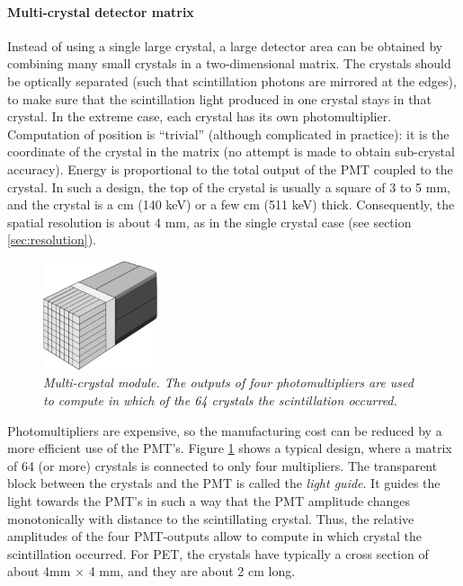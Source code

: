 \documentclass[11pt,oneside]{article}
\begin{document}
\paragraph{Multi-crystal detector matrix}
Instead of using a single large crystal, a large detector area can be
obtained by combining many small crystals in a two-dimensional
matrix. The crystals should be optically separated (such that
scintillation photons are mirrored at the edges), to make sure that
the scintillation light produced in one crystal stays in that
crystal. In the extreme case, each crystal has its own
photomultiplier. Computation of position is ``trivial'' (although
complicated in practice): it is the coordinate of the crystal in the
matrix (no attempt is made to obtain sub-crystal accuracy). Energy is
proportional to the total output of the PMT coupled to the crystal. In
such a design, the top of the crystal is usually a square of 3 to 5
mm, and the crystal is a cm (140 keV) or a few cm (511 keV) thick.
Consequently, the spatial resolution is about 4 mm, as in the single
crystal case (see section \ref{sec:resolution}).

\begin{figure}[tb]
\centering
\includegraphics[width=0.3\textwidth]{figs/fig_multicrystal.pdf}
\caption{\label{fig:multicrystal} \emph{Multi-crystal module. The outputs
of four photomultipliers are used to compute in which of the 64 crystals
the scintillation occurred.}}
\end{figure}

Photomultipliers are expensive, so the manufacturing cost can be
reduced by a more efficient use of the PMT's. Figure
\ref{fig:multicrystal} shows a typical design, where a matrix of 64
(or more) crystals is connected to only four multipliers. The
transparent block between the crystals and the PMT is called the {\em
light guide}.  It guides the light towards the PMT's in such a way
that the PMT amplitude changes monotonically with distance to the
scintillating crystal. Thus, the relative amplitudes of the four
PMT-outputs allow to compute in which crystal the scintillation
occurred. For PET, the crystals have typically a cross section of
about 4mm $\times$ 4 mm, and they are about 2 cm long.
\end{document}
